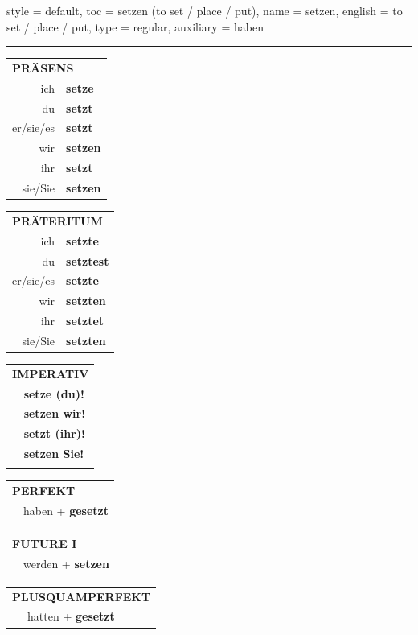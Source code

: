 \begin{verbentry}{
  style = {default},
  toc = {setzen (to set / place / put)},
  name = {setzen},
  english = {to set / place / put},
  type = {regular},
  auxiliary = {haben}
}
 
    
     \vspace{5pt}

    \hrule
    
    \vspace{5pt}

  \begin{tabular}{rl}
     \multicolumn{2}{l}{\textbf{PRÄSENS} }\\
    ich & \textbf{setze}\\
    du & \textbf{setzt}\\
    er/sie/es & \textbf{setzt}\\
    wir & \textbf{setzen}\\
    ihr & \textbf{setzt}\\
    sie/Sie & \textbf{setzen}\\
  \end{tabular}
  \hfill
  \begin{tabular}{rl}
    \multicolumn{2}{l}{\textbf{PRÄTERITUM} }\\
    ich & \textbf{setzte}\\
    du & \textbf{setztest}\\
    er/sie/es & \textbf{setzte}\\
    wir & \textbf{setzten}\\
    ihr & \textbf{setztet}\\
    sie/Sie & \textbf{setzten}\\
  \end{tabular}
  \hfill
  \begin{tabular}{rl}
     \multicolumn{2}{l}{\textbf{IMPERATIV} }\\
   & \textbf{setze (du)!}\\
   & \textbf{setzen wir!}\\
   & \textbf{setzt (ihr)!}\\
   & \textbf{setzen Sie!}\\
   & \vspace{10pt}
  \end{tabular}

 \vspace{10pt}

 \begin{tabular}{rl}
     \multicolumn{2}{l}{\textbf{PERFEKT}}\\
   & haben + \textbf{gesetzt}\\
  \end{tabular}
\hfill
\begin{tabular}{rl}
    \multicolumn{2}{l}{\textbf{FUTURE I}}\\
   & werden + \textbf{setzen}\\
  \end{tabular}
\hfill
\begin{tabular}{rl}
    \multicolumn{2}{l}{\textbf{PLUSQUAMPERFEKT}}\\
   & hatten + \textbf{gesetzt}\\
  \end{tabular}


\end{verbentry}
